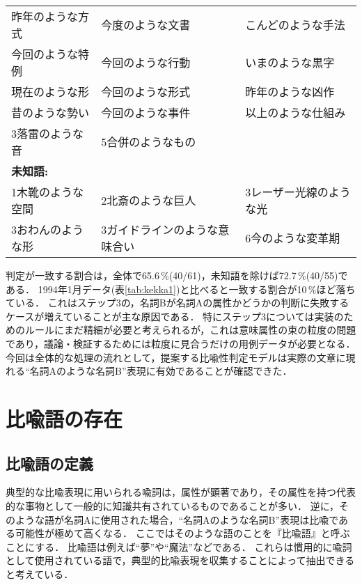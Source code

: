 \begin{table}[htbp]
\begin{center}
\begin{small}
\begin{tabular}{|lll|}
		昨年のような方式 & 今度のような文書 & こんどのような手法 \\
		今回のような特例 & 今回のような行動 & いまのような黒字 \\
		現在のような形 & 今回のような形式 & 昨年のような凶作 \\
		昔のような勢い & 今回のような事件 & 以上のような仕組み \\
		\hline
		3落雷のような音 & 5合併のようなもの & \\
		\hline
		\hline
		\multicolumn{3}{|l|}{{\bf 未知語: }} \\
		\hline
		1木靴のような空間 & 2北斎のような巨人 & 3レーザー光線のような光 \\
		3おわんのような形 & 3ガイドラインのような意味合い & 6今のような変革期 \\
		\hline
	\end{tabular}
	\end{small}
	\end{center}
	\label{tab:kekka2}
\end{table}

判定が一致する割合は，全体で65.6\,\%(40/61)，未知語を除けば72.7\,\%(40/55)である．
1994年1月データ(表\ref{tab:kekka1})と比べると一致する割合が10\,\%ほど落ちている．
これはステップ3の，名詞Bが名詞Aの属性かどうかの判断に失敗するケースが増えていることが主な原因である．
特にステップ3については実装のためのルールにまだ精細が必要と考えられるが，これは意味属性の束の粒度の問題であり，議論・検証するためには粒度に見合うだけの用例データが必要となる．
今回は全体的な処理の流れとして，提案する比喩性判定モデルは実際の文章に現れる``名詞Aのような名詞B''表現に有効であることが確認できた．

\section{比喩語の存在}\label{sec:hiyugo}

\subsection{比喩語の定義}

典型的な比喩表現に用いられる喩詞は，属性が顕著であり，その属性を持つ代表的な事物として一般的に知識共有されているものであることが多い．
逆に，そのような語が名詞Aに使用された場合，``名詞Aのような名詞B''表現は比喩である可能性が極めて高くなる．
ここではそのような語のことを『比喩語』と呼ぶことにする．
比喩語は例えば``夢''や``魔法''などである．
これらは慣用的に喩詞として使用されている語で，典型的比喩表現を収集することによって抽出できると考えている．

